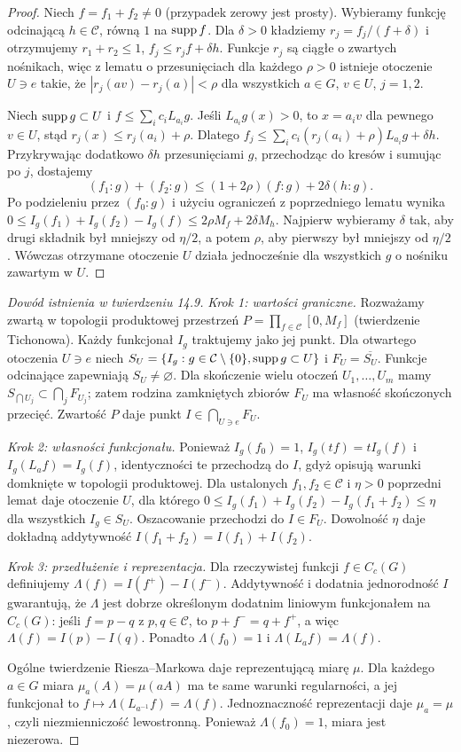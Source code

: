 \begin{proof}
Niech $f=f_1+f_2\ne0$ (przypadek zerowy jest prosty). Wybieramy funkcję odcinającą $h\in\mathcal C$, równą $1$ na $\operatorname{supp} f$. Dla $\delta>0$ kładziemy $r_j=f_j/(f+\delta)$ i otrzymujemy $r_1+r_2\le1$, $f_j\le r_jf+\delta h$. Funkcje $r_j$ są ciągłe o zwartych nośnikach, więc z lematu o przesunięciach dla każdego $\rho>0$ istnieje otoczenie $U\ni e$ takie, że $|r_j(av)-r_j(a)|<\rho$ dla wszystkich $a\in G$, $v\in U$, $j=1,2$.

Niech $\operatorname{supp} g\subset U$ i $f\le\sum_ic_iL_{a_i}g$. Jeśli $L_{a_i}g(x)>0$, to $x=a_iv$ dla pewnego $v\in U$, stąd $r_j(x)\le r_j(a_i)+\rho$. Dlatego
$f_j\le\sum_ic_i(r_j(a_i)+\rho)L_{a_i}g+\delta h$.
Przykrywając dodatkowo $\delta h$ przesunięciami $g$, przechodząc do kresów i sumując po $j$, dostajemy
\[
(f_1:g)+(f_2:g)\le(1+2\rho)(f:g)+2\delta(h:g).
\]
Po podzieleniu przez $(f_0:g)$ i użyciu ograniczeń z poprzedniego lematu wynika
$0\le I_g(f_1)+I_g(f_2)-I_g(f)\le2\rho M_f+2\delta M_h$. Najpierw wybieramy $\delta$ tak, aby drugi składnik był mniejszy od $\eta/2$, a potem $\rho$, aby pierwszy był mniejszy od $\eta/2$. Wówczas otrzymane otoczenie $U$ działa jednocześnie dla wszystkich $g$ o nośniku zawartym w $U$.
\end{proof}
\begin{proof}[Dowód istnienia w twierdzeniu 14.9]
\emph{Krok 1: wartości graniczne.} Rozważamy zwartą w topologii produktowej przestrzeń $P=\prod_{f\in\mathcal C}[0,M_f]$ (twierdzenie Tichonowa). Każdy funkcjonał $I_g$ traktujemy jako jej punkt. Dla otwartego otoczenia $U\ni e$ niech $S_U=\{I_g:g\in\mathcal C\setminus\{0\},\operatorname{supp} g\subset U\}$ i $F_U=\overline{S_U}$. Funkcje odcinające zapewniają $S_U\ne\varnothing$. Dla skończenie wielu otoczeń $U_1,\dots,U_m$ mamy $S_{\bigcap U_j}\subset\bigcap_j F_{U_j}$; zatem rodzina zamkniętych zbiorów $F_U$ ma własność skończonych przecięć. Zwartość $P$ daje punkt $I\in\bigcap_{U\ni e}F_U$.

\emph{Krok 2: własności funkcjonału.} Ponieważ $I_g(f_0)=1$, $I_g(tf)=tI_g(f)$ i $I_g(L_af)=I_g(f)$, identyczności te przechodzą do $I$, gdyż opisują warunki domknięte w topologii produktowej. Dla ustalonych $f_1,f_2\in\mathcal C$ i $\eta>0$ poprzedni lemat daje otoczenie $U$, dla którego $0\le I_g(f_1)+I_g(f_2)-I_g(f_1+f_2)\le\eta$ dla wszystkich $I_g\in S_U$. Oszacowanie przechodzi do $I\in F_U$. Dowolność $\eta$ daje dokładną addytywność $I(f_1+f_2)=I(f_1)+I(f_2)$.

\emph{Krok 3: przedłużenie i reprezentacja.} Dla rzeczywistej funkcji $f\in C_c(G)$ definiujemy $\Lambda(f)=I(f^+)-I(f^-)$. Addytywność i dodatnia jednorodność $I$ gwarantują, że $\Lambda$ jest dobrze określonym dodatnim liniowym funkcjonałem na $C_c(G)$: jeśli $f=p-q$ z $p,q\in\mathcal C$, to $p+f^-=q+f^+$, a więc $\Lambda(f)=I(p)-I(q)$. Ponadto $\Lambda(f_0)=1$ i $\Lambda(L_af)=\Lambda(f)$.

Ogólne twierdzenie Riesza--Markowa daje reprezentującą miarę $\mu$. Dla każdego $a\in G$ miara $\mu_a(A)=\mu(aA)$ ma te same warunki regularności, a jej funkcjonał to $f\mapsto\Lambda(L_{a^{-1}}f)=\Lambda(f)$. Jednoznaczność reprezentacji daje $\mu_a=\mu$, czyli niezmienniczość lewostronną. Ponieważ $\Lambda(f_0)=1$, miara jest niezerowa.
\end{proof}

